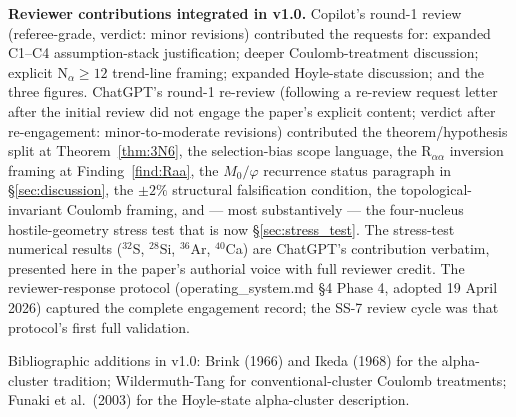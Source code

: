 \documentclass[11pt,letterpaper]{article}
\begin{document}
\textbf{Reviewer contributions integrated in v1.0.} Copilot's round-1 review (referee-grade, verdict: minor revisions) contributed the requests for: expanded C1--C4 assumption-stack justification; deeper Coulomb-treatment discussion; explicit N$_\alpha \geq 12$ trend-line framing; expanded Hoyle-state discussion; and the three figures. ChatGPT's round-1 re-review (following a re-review request letter after the initial review did not engage the paper's explicit content; verdict after re-engagement: minor-to-moderate revisions) contributed the theorem/hypothesis split at Theorem~\ref{thm:3N6}, the selection-bias scope language, the R$_{\alpha\alpha}$ inversion framing at Finding~\ref{find:Raa}, the $M_0/\varphi$ recurrence status paragraph in \S\ref{sec:discussion}, the $\pm 2\%$ structural falsification condition, the topological-invariant Coulomb framing, and --- most substantively --- the four-nucleus hostile-geometry stress test that is now \S\ref{sec:stress_test}. The stress-test numerical results (${}^{32}$S, ${}^{28}$Si, ${}^{36}$Ar, ${}^{40}$Ca) are ChatGPT's contribution verbatim, presented here in the paper's authorial voice with full reviewer credit. The reviewer-response protocol (operating\_system.md \S 4 Phase 4, adopted 19 April 2026) captured the complete engagement record; the SS-7 review cycle was that protocol's first full validation.

Bibliographic additions in v1.0: Brink (1966) and Ikeda (1968) for the alpha-cluster tradition; Wildermuth-Tang for conventional-cluster Coulomb treatments; Funaki et al.\ (2003) for the Hoyle-state alpha-cluster description.
\end{document}

